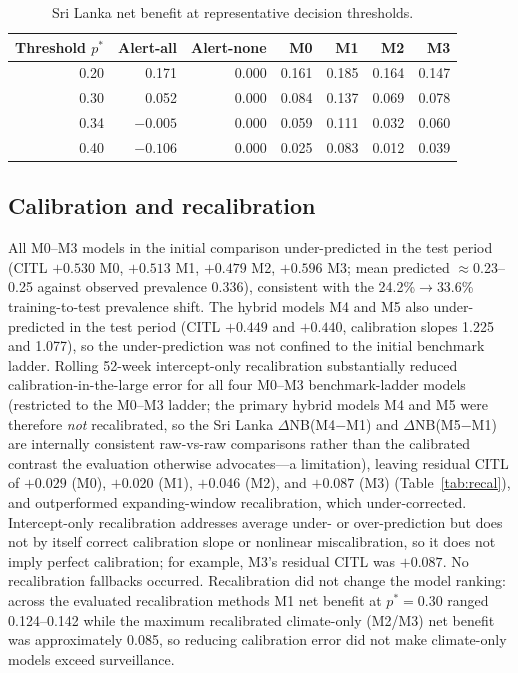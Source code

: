 \documentclass[11pt,a4paper]{article}
\begin{document}
\begin{table}[htbp]
\centering
\caption{Sri Lanka net benefit at representative decision thresholds.}
\label{tab:slthresh}
\small
\begin{tabular}{rrrrrrr}
\toprule
Threshold $p^*$ & Alert-all & Alert-none & M0 & M1 & M2 & M3 \\
\midrule
0.20 & 0.171 & 0.000 & 0.161 & 0.185 & 0.164 & 0.147 \\
0.30 & 0.052 & 0.000 & 0.084 & 0.137 & 0.069 & 0.078 \\
0.34 & $-0.005$ & 0.000 & 0.059 & 0.111 & 0.032 & 0.060 \\
0.40 & $-0.106$ & 0.000 & 0.025 & 0.083 & 0.012 & 0.039 \\
\bottomrule
\end{tabular}
\end{table}



\subsection{Calibration and recalibration}
All M0--M3 models in the initial comparison under-predicted in the test period (CITL $+0.530$ M0, $+0.513$ M1, $+0.479$ M2, $+0.596$ M3; mean predicted $\approx$0.23--0.25 against observed prevalence 0.336), consistent with the 24.2\%$\rightarrow$33.6\% training-to-test prevalence shift. The hybrid models M4 and M5 also under-predicted in the test period (CITL $+0.449$ and $+0.440$, calibration slopes 1.225 and 1.077), so the under-prediction was not confined to the initial benchmark ladder. Rolling 52-week intercept-only recalibration substantially reduced calibration-in-the-large error for all four M0--M3 benchmark-ladder models (restricted to the M0--M3 ladder; the primary hybrid models M4 and M5 were therefore \emph{not} recalibrated, so the Sri Lanka $\Delta$NB(M4$-$M1) and $\Delta$NB(M5$-$M1) are internally consistent raw-vs-raw comparisons rather than the calibrated contrast the evaluation otherwise advocates---a limitation), leaving residual CITL of $+0.029$ (M0), $+0.020$ (M1), $+0.046$ (M2), and $+0.087$ (M3) (Table~\ref{tab:recal}), and outperformed expanding-window recalibration, which under-corrected. Intercept-only recalibration addresses average under- or over-prediction but does not by itself correct calibration slope or nonlinear miscalibration, so it does not imply perfect calibration; for example, M3's residual CITL was $+0.087$. No recalibration fallbacks occurred. Recalibration did not change the model ranking: across the evaluated recalibration methods M1 net benefit at $p^*=0.30$ ranged 0.124--0.142 while the maximum recalibrated climate-only (M2/M3) net benefit was approximately 0.085, so reducing calibration error did not make climate-only models exceed surveillance.
\end{document}
